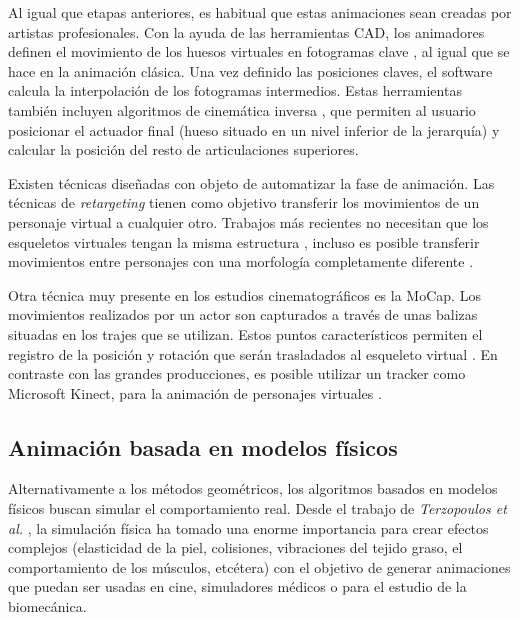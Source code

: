 Al igual que etapas anteriores, es habitual que estas animaciones sean creadas por artistas profesionales. Con la ayuda de las herramientas \ac{CAD}, los animadores definen el movimiento de los huesos virtuales en fotogramas clave \cite{keyframe}, al igual que se hace en la animación clásica. Una vez definido las posiciones claves, el software calcula la interpolación de los fotogramas intermedios. Estas herramientas también incluyen algoritmos de cinemática inversa \cite{Shi:2007}, que permiten al usuario posicionar el actuador final (hueso situado en un nivel inferior de la jerarquía) y calcular la posición del resto de articulaciones superiores. 


Existen técnicas diseñadas con objeto de automatizar la fase de animación. Las técnicas de \emph{retargeting}\cite{Choi999} tienen como objetivo transferir los movimientos de un personaje virtual a cualquier otro. Trabajos más recientes no necesitan que los esqueletos virtuales tengan la misma estructura \cite{Hecker2008}, incluso es posible transferir movimientos entre personajes con una morfología completamente diferente \cite{Abdul2017}.


Otra técnica muy presente en los estudios cinematográficos es la \ac{MoCap}. Los movimientos realizados por un actor son capturados a través de unas balizas situadas en los trajes que se utilizan. Estos puntos característicos permiten el registro de la posición y rotación que serán trasladados al esqueleto virtual \cite{Menache:1999}. En contraste con las grandes producciones, es posible utilizar un \ac{tracker} como Microsoft Kinect, para la animación de personajes virtuales \cite{Liu:2018}.




\subsection{Animación basada en modelos físicos}
\label{art:fisica}

Alternativamente a los métodos geométricos, los algoritmos basados en modelos físicos buscan simular el comportamiento real. Desde el trabajo de \emph{Terzopoulos et al.} \cite{terzopoulos1987elastically}, la simulación física ha tomado una enorme importancia para crear  efectos complejos (elasticidad de la piel, colisiones, vibraciones del tejido graso, el comportamiento de los músculos, etcétera) con el objetivo de generar animaciones que puedan ser usadas en cine, simuladores médicos o para el estudio de la biomecánica. 

